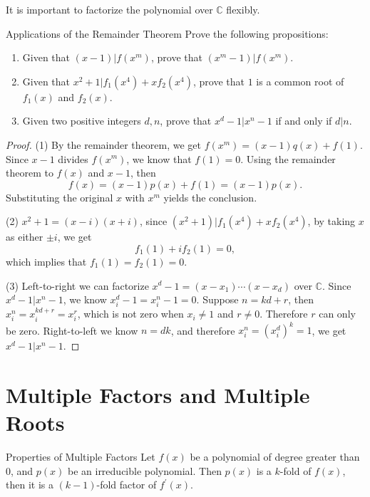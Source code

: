 \begin{note}
  It is important to factorize the polynomial over $\mathbb{C}$ flexibly.
\end{note}

\begin{example}{Applications of the Remainder Theorem}{}
  Prove the following propositions:
  \begin{enumerate}
  \item Given that $(x - 1)| f(x^m)$, prove that $(x^m - 1) | f(x^m)$.
  \item Given that $x^2 + 1 | f_1(x^4) + xf_2(x^4)$, prove that $1$ is a
    common root of $f_1(x)$ and $f_2(x)$.
  \item Given two positive integers $d, n$,
    prove that $x^d - 1 | x^n - 1$ if and only if $d|n$.
  \end{enumerate}
\end{example}

\begin{proof}
  (1) By the remainder theorem, we get $f(x^m) = (x-1)q(x) + f(1)$.
  Since $x-1$ divides $f(x^m)$, we know that $f(1) = 0$.
  Using the remainder theorem to $f(x)$ and $x-1$, then
  \begin{equation}
    f(x) = (x-1)p(x) + f(1) = (x-1)p(x).
  \end{equation}
  Substituting the original $x$ with $x^m$ yields the conclusion.

  (2) $x^2 + 1 = (x-i)(x+i)$,
  since $(x^2 + 1)|f_1(x^4) + xf_2(x^4)$,
  by taking $x$ as either $\pm i$, we get
  \begin{equation}
    f_1(1) + i f_2(1) = 0,
  \end{equation}
  which implies that $f_1(1) = f_2(1) = 0$.

  (3) Left-to-right we can factorize $x^d - 1 = (x - x_1)\cdots(x-x_d)$ over $\mathbb{C}$.
  Since $x^d - 1 | x^n - 1$, we know $x_i^d - 1 = x_i^n - 1 = 0$.
  Suppose $n = kd + r$, then $x_i^n = x_i^{kd+r} = x_i^r$, which is not zero
  when $x_i \neq 1$ and $r \neq 0$. Therefore $r$ can only be zero.
  Right-to-left we know $n = dk$, and therefore $x_i^n = (x_i^d)^k = 1$,
  we get $x^d - 1|x^n - 1$.
\end{proof}

\section{Multiple Factors and Multiple Roots}

\begin{proposition}{Properties of Multiple Factors}{}
  Let $f(x)$ be a polynomial of degree greater than $0$,
  and $p(x)$ be an irreducible polynomial. Then
  $p(x)$ is a $k$-fold of $f(x)$, then it is a $(k-1)$-fold factor of $f^{\prime}(x)$.
\end{proposition}

